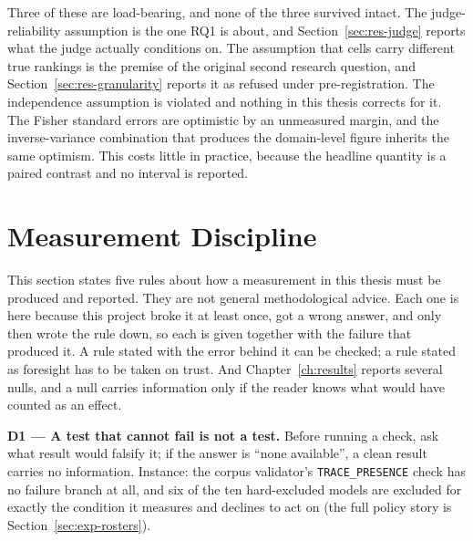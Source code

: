 Three of these are load-bearing, and none of the three survived intact.
The judge-reliability assumption is the one RQ1 is about, and
Section~\ref{sec:res-judge} reports what the judge actually conditions
on. The assumption that cells carry different true rankings is the
premise of the original second research question, and
Section~\ref{sec:res-granularity} reports it as refused under
pre-registration. The independence assumption is violated and nothing
in this thesis corrects for it. The Fisher standard errors are
optimistic by an unmeasured margin, and the inverse-variance
combination that produces the domain-level figure inherits the same
optimism. This costs little in practice, because the headline quantity
is a paired contrast and no interval is reported.

\section{Measurement Discipline}\label{sec:meth-discipline}

This section states five rules about how a measurement in this thesis
must be produced and reported. They are not general methodological
advice. Each one is here because this project broke it at least once,
got a wrong answer, and only then wrote the rule down, so each is given
together with the failure that produced it. A rule stated with the
error behind it can be checked; a rule stated as foresight has to be
taken on trust. And Chapter~\ref{ch:results} reports several nulls, and
a null carries information only if the reader knows what would have
counted as an effect.

\textbf{D1 --- A test that cannot fail is not a test.}
Before running a check, ask what result would falsify it; if the answer
is ``none available'', a clean result carries no information.
Instance: the corpus validator's \texttt{TRACE\_PRESENCE} check has no
failure branch at all, and six of the ten hard-excluded models are
excluded for exactly the condition it measures and declines to act on
(the full policy story is Section~\ref{sec:exp-rosters}).

